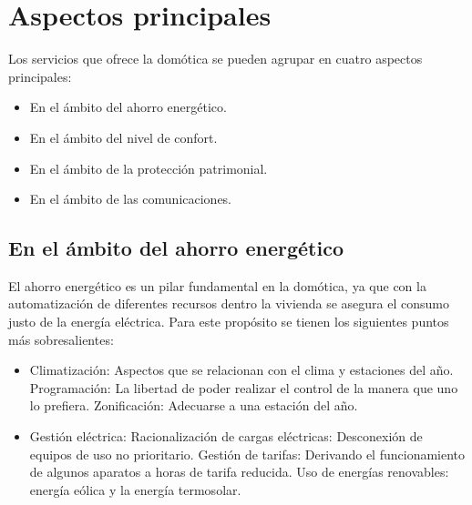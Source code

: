 \documentclass[11pt,letterpaper]{report}
\begin{document}
	\section{Aspectos principales}
	Los servicios que ofrece la domótica se pueden agrupar en cuatro aspectos principales:\citep{moya2004}
	\begin{itemize}
		\item En el ámbito del ahorro energético.
		\item En el ámbito del nivel de confort.
		\item En el ámbito de la protección patrimonial.
		\item En el ámbito de las comunicaciones.
	\end{itemize}
	\subsection{En el ámbito del ahorro energético}
	El ahorro energético es un pilar fundamental en la domótica, ya que con la automatización de diferentes recursos dentro la vivienda se asegura el consumo justo de la energía eléctrica. Para este propósito se tienen los siguientes puntos  más sobresalientes:
	\begin{itemize}
		\item Climatización: Aspectos que se relacionan con el clima y estaciones del año.
			\subitem Programación: La libertad de poder realizar el control de la manera que uno lo prefiera.
			\subitem Zonificación: Adecuarse a una estación del año.
		\item Gestión eléctrica:
			\subitem Racionalización de cargas eléctricas: Desconexión de equipos de uso no prioritario.
			\subitem Gestión de tarifas: Derivando el funcionamiento de algunos aparatos a horas de tarifa reducida.
			\subitem Uso de energías renovables: energía eólica y la energía termosolar. 
	\end{itemize}	
\end{document}
